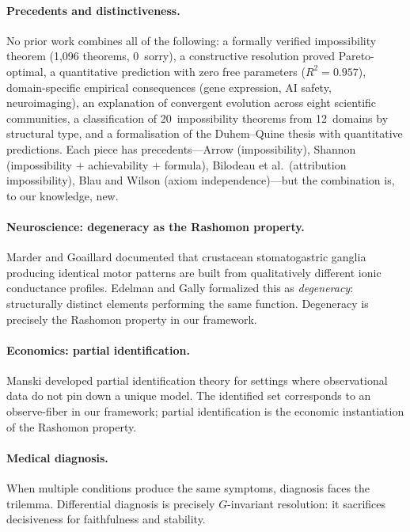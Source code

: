 \documentclass[11pt,a4paper]{article}
\begin{document}
\paragraph{Precedents and distinctiveness.}
No prior work combines all of the following: a formally verified
impossibility theorem (1{,}096 theorems, 0~sorry), a constructive
resolution proved Pareto-optimal, a quantitative prediction with zero
free parameters ($R^2 = 0.957$), domain-specific empirical consequences
(gene expression, AI safety, neuroimaging), an explanation of convergent
evolution across eight scientific communities, a classification of
20~impossibility theorems from 12~domains by structural type, and a
formalisation of the Duhem--Quine thesis with quantitative predictions.
Each piece has precedents---Arrow (impossibility), Shannon (impossibility
$+$ achievability $+$ formula), Bilodeau et al.\ (attribution
impossibility), Blau and Wilson (axiom independence)---but the
combination is, to our knowledge, new.

\paragraph{Neuroscience: degeneracy as the Rashomon property.}
Marder and Goaillard \citep{marder2006variability} documented that crustacean
stomatogastric ganglia producing identical motor patterns are built from
qualitatively different ionic conductance profiles.  Edelman and Gally
\citep{edelman2001degeneracy} formalized this as \emph{degeneracy}:
structurally distinct elements performing the same function.  Degeneracy is
precisely the Rashomon property in our framework.

\paragraph{Economics: partial identification.}
Manski \citep{manski2003partial} developed partial identification theory for
settings where observational data do not pin down a unique model.  The
identified set corresponds to an observe-fiber in our framework; partial
identification is the economic instantiation of the Rashomon property.

\paragraph{Medical diagnosis.}
When multiple conditions produce the same symptoms, diagnosis faces the
trilemma.  Differential diagnosis is precisely $G$-invariant resolution:
it sacrifices decisiveness for faithfulness and stability.
\end{document}
